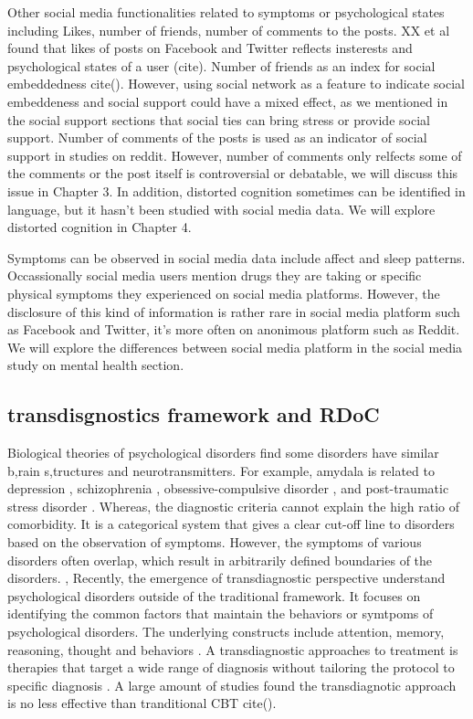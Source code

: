Other social media functionalities related to symptoms or psychological states including Likes, number of friends, number of comments to the posts. XX et al found that likes of posts on Facebook and Twitter reflects insterests and psychological states of a user (cite). Number of friends as an index for social embeddedness cite(). However, using social network as a feature to indicate social embeddeness and social support could have a mixed effect, as we mentioned in the social support sections that social ties can bring stress or provide social support. Number of comments of the posts is used as an indicator of social support in studies on reddit. However, number of comments only relfects some of the comments or the post itself is controversial or debatable, we will discuss this issue in Chapter 3. In addition, distorted cognition sometimes can be identified in language, but it hasn't been studied with social media data. We will explore distorted cognition in Chapter 4. 

Symptoms can be observed in social media data include affect and sleep patterns. Occassionally social media users mention drugs they are taking or specific physical symptoms they experienced on social media platforms. However, the disclosure of this kind of information is rather rare in social media platform such as Facebook and Twitter, it's more often on anonimous platform such as Reddit. We will explore the differences between social media platform in the social media study on mental health section.


\subsection{transdisgnostics framework and RDoC}

Biological theories of psychological disorders find some disorders have similar b,rain s,tructures and neurotransmitters. For example, amydala is related to depression \cite{bowley2002low}, schizophrenia \cite{kosaka2002differential,kubicki2002voxel} , obsessive-compulsive disorder \cite{szeszko1999orbital}, and post-traumatic stress disorder \cite{rauch2000exaggerated}. Whereas, the diagnostic criteria cannot explain the high ratio of comorbidity. It is a categorical system that gives a clear cut-off line to disorders based on the observation of symptoms. However, the symptoms of various disorders often overlap, which result in arbitrarily defined boundaries of the disorders. 
,
Recently, the emergence of transdiagnostic perspective understand psychological disorders outside of the traditional framework. It focuses on identifying the common factors that maintain the behaviors or symtpoms of psychological disorders. The underlying constructs include attention, memory, reasoning, thought and behaviors \cite{harvey2004cognitive}. A transdiagnostic approaches to treatment is therapies that target a wide range of diagnosis without tailoring the protocol to specific diagnosis \cite{mansell2008cognitive}. A large amount of studies found the transdiagnotic approach is no less effective than tranditional CBT cite().

